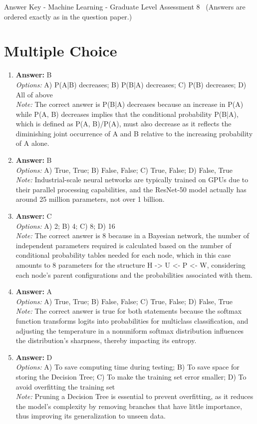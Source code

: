 \documentclass[12pt]{article}
\begin{document}
\begin{center}
Answer Key - Machine Learning - Graduate Level Assessment 8 \
\small (Answers are ordered exactly as in the question paper.)
\end{center}

\section*{Multiple Choice}
\begin{enumerate}[label=\arabic*.]
\item \textbf{Answer:} B
\\ \textit{Options:} A) P(A|B) decreases; B) P(B|A) decreases; C) P(B) decreases; D) All of above
\\ \textit{Note:} The correct answer is P(B|A) decreases because an increase in P(A) while P(A, B) decreases implies that the conditional probability P(B|A), which is defined as P(A, B)/P(A), must also decrease as it reflects the diminishing joint occurrence of A and B relative to the increasing probability of A alone.
\item \textbf{Answer:} B
\\ \textit{Options:} A) True, True; B) False, False; C) True, False; D) False, True
\\ \textit{Note:} Industrial-scale neural networks are typically trained on GPUs due to their parallel processing capabilities, and the ResNet-50 model actually has around 25 million parameters, not over 1 billion.
\item \textbf{Answer:} C
\\ \textit{Options:} A) 2; B) 4; C) 8; D) 16
\\ \textit{Note:} The correct answer is 8 because in a Bayesian network, the number of independent parameters required is calculated based on the number of conditional probability tables needed for each node, which in this case amounts to 8 parameters for the structure H -\textgreater{} U \textless{}- P \textless{}- W, considering each node's parent configurations and the probabilities associated with them.
\item \textbf{Answer:} A
\\ \textit{Options:} A) True, True; B) False, False; C) True, False; D) False, True
\\ \textit{Note:} The correct answer is true for both statements because the softmax function transforms logits into probabilities for multiclass classification, and adjusting the temperature in a nonuniform softmax distribution influences the distribution's sharpness, thereby impacting its entropy.
\item \textbf{Answer:} D
\\ \textit{Options:} A) To save computing time during testing; B) To save space for storing the Decision Tree; C) To make the training set error smaller; D) To avoid overfitting the training set
\\ \textit{Note:} Pruning a Decision Tree is essential to prevent overfitting, as it reduces the model's complexity by removing branches that have little importance, thus improving its generalization to unseen data.
\end{enumerate}
\end{document}
